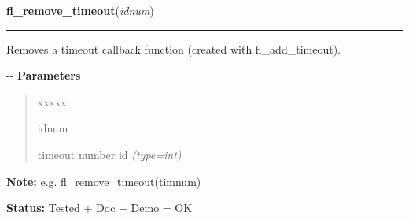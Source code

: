     \label{xformslib:flbasic:fl_remove_timeout}

    \vspace{0.5ex}

\hspace{.8\funcindent}\begin{boxedminipage}{\funcwidth}

    \raggedright \textbf{fl\_remove\_timeout}(\textit{idnum})

    \vspace{-1.5ex}

    \rule{\textwidth}{0.5\fboxrule}
\setlength{\parskip}{2ex}

Removes a timeout callback function (created with fl\_add\_timeout).

-{}-
\setlength{\parskip}{1ex}
      \textbf{Parameters}
      \vspace{-1ex}

      \begin{quote}
        \begin{Ventry}{xxxxx}

          \item[idnum]


timeout number id
            {\it (type=int)}

        \end{Ventry}

      \end{quote}

\textbf{Note:} 
e.g. fl\_remove\_timeout(timnum)


\textbf{Status:} 
Tested + Doc + Demo = OK


    \end{boxedminipage}

    \label{xformslib:flbasic:fl_library_version}

    \vspace{0.5ex}

